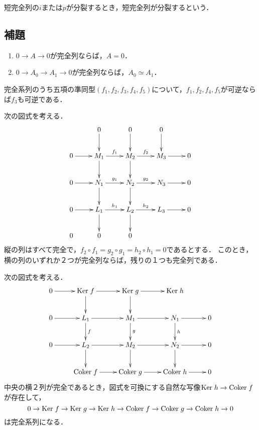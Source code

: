 \documentclass[uplatex,dvipdfmx]{jsreport}
\begin{document}
\begin{definition}
    短完全列の$i$または$p$が分裂するとき，短完全列が分裂するという．
\end{definition}

\subsection{補題}

\begin{lemma}\mbox{}
    \begin{enumerate}
        \item $0\to A\to 0$が完全列ならば，$A=0$．
        \item $0\to A_0\to A_1\to 0$が完全列ならば，$A_0\simeq A_1$．
    \end{enumerate}
\end{lemma}

\begin{lemma}
    完全系列のうち五項の準同型$(f_1,f_2,f_3,f_4,f_5)$について，$f_1,f_2,f_4,f_5$が可逆ならば$f_3$も可逆である．
\end{lemma}

\begin{lemma}
    次の図式を考える．
    \[\xymatrix{
            &0\ar[d]&0\ar[d]&0\ar[d]\\
        0\ar[r]&M_1\ar[r]^-{f_1}\ar[d]&M_2\ar[r]^-{f_2}\ar[d]&M_3\ar[r]&0\\
        0\ar[r]&N_1\ar[r]^-{g_1}\ar[d]&N_2\ar[r]^-{g_2}\ar[d]&N_3\ar[r]&0\\
        0\ar[r]&L_1\ar[r]^-{h_1}\ar[d]&L_2\ar[r]^-{h_2}\ar[d]&L_3\ar[r]&0\\
            0&0&0
    }\]
    縦の列はすべて完全で，$f_2\circ f_1=g_2\circ g_1=h_2\circ h_1=0$であるとする．
    このとき，横の列のいずれか２つが完全列ならば，残りの１つも完全列である．
\end{lemma}

\begin{lemma}
    次の図式を考える．
    \[\xymatrix{
        0\ar[r]&\Ker f\ar[d]\ar[r]&\Ker g\ar[d]\ar[r]&\Ker h\\
        0\ar[r]&L_1\ar[d]^-f\ar[r]&M_1\ar[r]\ar[d]^-g&N_1\ar[r]\ar[d]^-h&0\\
        0\ar[r]&L_2\ar[d]\ar[r]&M_2\ar[d]\ar[r]&N_2\ar[d]\ar[r]&0\\
            &\Coker f\ar[r]&\Coker g\ar[r]&\Coker h\ar[r]&0
    }\]
    中央の横２列が完全であるとき，図式を可換にする自然な写像$\mathrm{Ker}\; h\to\mathrm{Coker}\; f$が存在して，
    \[0\to\mathrm{Ker}\; f\to\mathrm{Ker}\; g\to\mathrm{Ker}\; h\to\mathrm{Coker}\; f\to\mathrm{Coker}\; g\to\mathrm{Coker}\; h\to0\]
    は完全系列になる．
\end{lemma}
\end{document}
